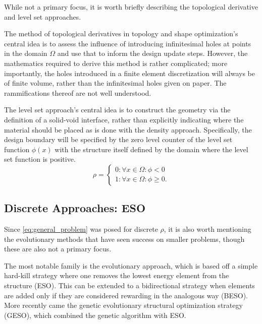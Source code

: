 While not a primary focus, it is worth briefly describing the topological derivative and level set approaches.

The method of topological derivatives in topology and shape optimization's central idea is to assess the influence of
introducing infinitesimal holes at points in the domain $\Omega$ and use that to inform the design update steps.
However, the mathematics required to derive this method is rather complicated; more importantly, the holes introduced
in a finite element discretization will always be of finite volume, rather than the infinitesimal holes given
on paper. The rammifications thereof are not well understood.

The level set approach's central idea is to construct the geometry via the definition of a solid-void interface,
rather than explicitly indicating where the material should be placed as is done with the density approach.
Specifically, the design boundary will be specified by the zero level counter of the level set function 
$\phi(x)$ with the structure itself defined by the domain where the level set function is positive.
\begin{equation}
    \rho = \begin{cases}
        0 : \forall x \in \Omega : \phi < 0\\
        1 : \forall x \in \Omega : \phi \geq 0.
    \end{cases}
\end{equation}

\subsection{Discrete Approaches: ESO}

Since \autoref{eq:general_problem} was posed for discrete $\rho$, it is also worth mentioning the evolutionary
methods that have seen success on smaller problems, though these are also not a primary focus.

The most notable family is the evolutionary approach, which is based off a simple hard-kill strategy
where one removes the lowest energy element from the structure (ESO). This can be extended to a bidirectional
strategy when elements are added only if they are considered rewarding in the analogous way (BESO).
More recently came the genetic evolutionary structural optimization strategy (GESO), which combined the
genetic algorithm with ESO.


